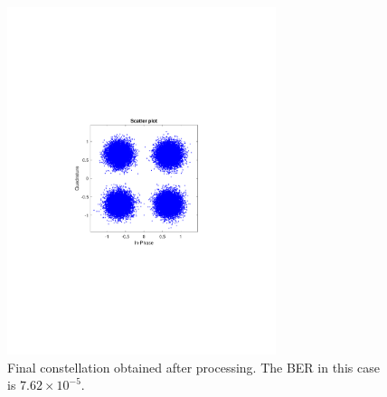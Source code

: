 \begin{refsection}
\begin{figure}[H]
	\centering
	\includegraphics[clip, trim=4cm 8cm 4cm 8cm,
	width=0.7\textwidth]{./sdf/m_qam_system/figures/expResults/intradyne/7_4GBdInSig13dB_const.pdf}
	\caption{Final constellation obtained after processing. The BER in this case is $7.62 \times 10^{-5}$.}
	\label{fig:4GBdFinal}
\end{figure}


\end{refsection}
